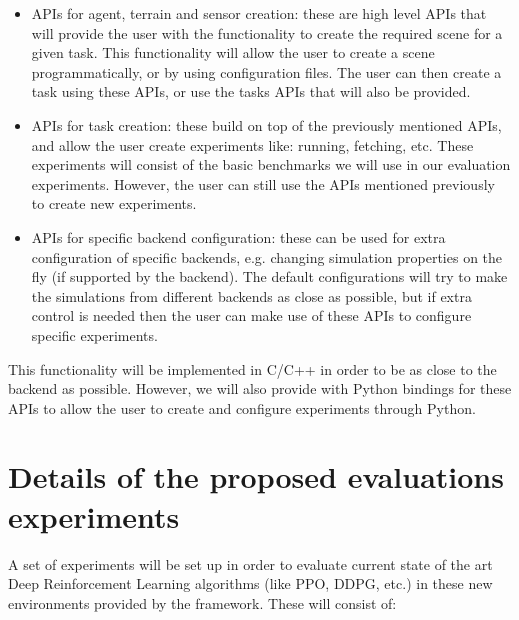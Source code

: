 \begin{itemize}
    \item APIs for agent, terrain and sensor creation: these are high level APIs 
          that will provide the user with the functionality to create the required
          scene for a given task. This functionality will allow the user to create
          a scene programmatically, or by using configuration files. The user can then
          create a task using these APIs, or use the tasks APIs that will also be provided.
    \item APIs for task creation: these build on top of the previously mentioned APIs,
          and allow the user create experiments like: running, fetching, etc. These
          experiments will consist of the basic benchmarks we will use in our evaluation
          experiments. However, the user can still use the APIs mentioned previously to
          create new experiments.
    \item APIs for specific backend configuration: these can be used for extra configuration
          of specific backends, e.g. changing simulation properties on the fly (if supported
          by the backend). The default configurations will try to make the simulations from different
          backends as close as possible, but if extra control is needed then the user can make
          use of these APIs to configure specific experiments.
\end{itemize}

This functionality will be implemented in C/C++ in order to be as close to the backend as possible.
However, we will also provide with Python bindings for these APIs to allow the user to create and 
configure experiments through Python.

\section{Details of the proposed evaluations experiments}

A set of experiments will be set up in order to evaluate current state of the art Deep Reinforcement
Learning algorithms (like PPO, DDPG, etc.) in these new environments provided by the framework. These will consist of:

